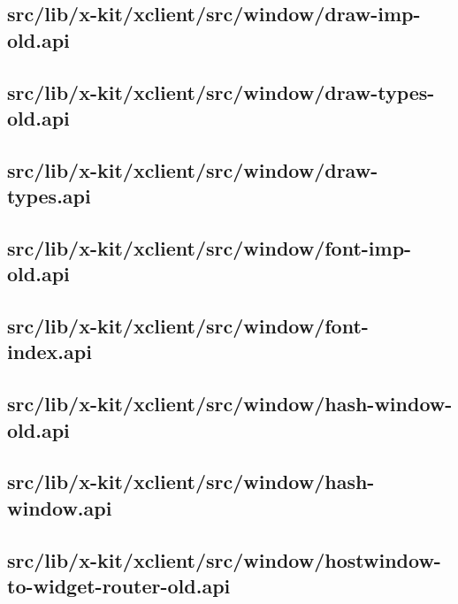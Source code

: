 \subsection{src/lib/x-kit/xclient/src/window/draw-imp-old.api}


\subsection{src/lib/x-kit/xclient/src/window/draw-types-old.api}


\subsection{src/lib/x-kit/xclient/src/window/draw-types.api}


\subsection{src/lib/x-kit/xclient/src/window/font-imp-old.api}


\subsection{src/lib/x-kit/xclient/src/window/font-index.api}


\subsection{src/lib/x-kit/xclient/src/window/hash-window-old.api}


\subsection{src/lib/x-kit/xclient/src/window/hash-window.api}


\subsection{src/lib/x-kit/xclient/src/window/hostwindow-to-widget-router-old.api}


